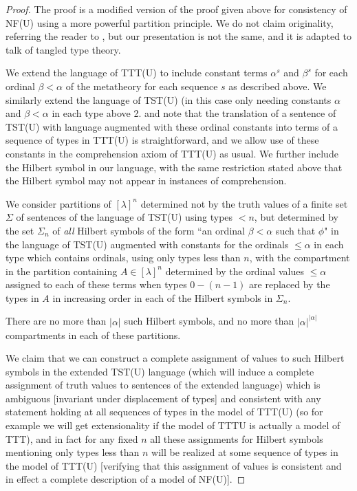 \documentclass[112pt]{article}
\theoremstyle{definition}
\theoremstyle{remark}
\begin{document}
\begin{proof}

The proof is a modified version of the proof given above for consistency of NF(U) using a more powerful partition principle.  We do not claim originality, referring the reader to \cite{nfu}, but our presentation is not the same, and it is adapted to talk of tangled type theory.

We extend the language of TTT(U) to include constant terms $\alpha^s$ and $\beta^s$ for each ordinal $\beta < \alpha$ of the metatheory for each sequence $s$ as described above.   We similarly extend the language of TST(U) (in this case only needing constants $\alpha$ and $\beta<\alpha$ in each type above 2.  and note that the translation of a sentence of TST(U) with language augmented with these ordinal constants into terms of a sequence of types in TTT(U) is straightforward, and we allow use of these constants in the comprehension axiom of TTT(U) as usual.  We further include the Hilbert symbol in our language, with the same restriction stated above that the Hilbert symbol may not appear in instances of comprehension.

We consider partitions of $[\lambda]^n$ determined not by the truth values of a finite set $\Sigma$ of sentences of the language of TST(U) using types $<n$, but  determined by the set $\Sigma_n$ of {\em all\/} Hilbert symbols of the form ``an ordinal $\beta < \alpha$ such that $\phi$"
in the language of TST(U) augmented with constants for the ordinals $\leq \alpha$ in each type which contains ordinals, using only types less than $n$, with the compartment in the partition containing $A \in [\lambda]^n$ determined by the ordinal values $\leq \alpha$ assigned to each of these terms when types $0-(n-1)$ are replaced by the types in $A$ in increasing order in each of the Hilbert symbols in $\Sigma_n$.

There are no more than $|\alpha|$ such Hilbert symbols, and no more than $|\alpha|^{|\alpha|}$ compartments in each of these partitions.

We claim that we can construct a complete assignment of values to such Hilbert symbols in the extended TST(U) language (which will induce a complete assignment of truth values to sentences of the extended language) which is ambiguous [invariant under displacement of types] and consistent with any statement holding at all sequences of types in the model of TTT(U) (so for example we will get extensionality if the model of TTTU is actually a model of TTT), and in fact for any fixed $n$ all these assignments for Hilbert symbols mentioning only types less than $n$ will be realized at some sequence of types in the model of TTT(U) [verifying that this assignment of values is consistent and in effect a complete description of a model of NF(U)].


\end{proof}
\end{document}
